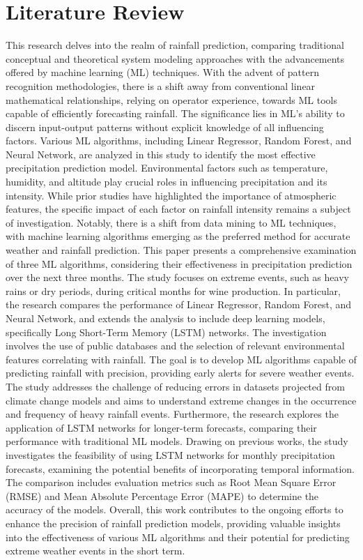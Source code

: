 \documentclass[conference]{IEEEtran}
\begin{document}
\section{\textbf{Literature Review}}
This research delves into the realm of rainfall prediction, comparing traditional conceptual and theoretical system modeling approaches with the advancements offered by machine learning (ML) techniques. With the advent of pattern recognition methodologies, there is a shift away from conventional linear mathematical relationships, relying on operator experience, towards ML tools capable of efficiently forecasting rainfall. The significance lies in ML's ability to discern input-output patterns without explicit knowledge of all influencing factors. Various ML algorithms, including Linear Regressor, Random Forest, and Neural Network, are analyzed in this study to identify the most effective precipitation prediction model. Environmental factors such as temperature, humidity, and altitude play crucial roles in influencing precipitation and its intensity. While prior studies have highlighted the importance of atmospheric features, the specific impact of each factor on rainfall intensity remains a subject of investigation. Notably, there is a shift from data mining to ML techniques, with machine learning algorithms emerging as the preferred method for accurate weather and rainfall prediction. This paper presents a comprehensive examination of three ML algorithms, considering their effectiveness in precipitation prediction over the next three months. The study focuses on extreme events, such as heavy rains or dry periods, during critical months for wine production. In particular, the research compares the performance of Linear Regressor, Random Forest, and Neural Network, and extends the analysis to include deep learning models, specifically Long Short-Term Memory (LSTM) networks. The investigation involves the use of public databases and the selection of relevant environmental features correlating with rainfall. The goal is to develop ML algorithms capable of predicting rainfall with precision, providing early alerts for severe weather events. The study addresses the challenge of reducing errors in datasets projected from climate change models and aims to understand extreme changes in the occurrence and frequency of heavy rainfall events. Furthermore, the research explores the application of LSTM networks for longer-term forecasts, comparing their performance with traditional ML models. Drawing on previous works, the study investigates the feasibility of using LSTM networks for monthly precipitation forecasts, examining the potential benefits of incorporating temporal information. The comparison includes evaluation metrics such as Root Mean Square Error (RMSE) and Mean Absolute Percentage Error (MAPE) to determine the accuracy of the models. Overall, this work contributes to the ongoing efforts to enhance the precision of rainfall prediction models, providing valuable insights into the effectiveness of various ML algorithms and their potential for predicting extreme weather events in the short term.
\end{document}
